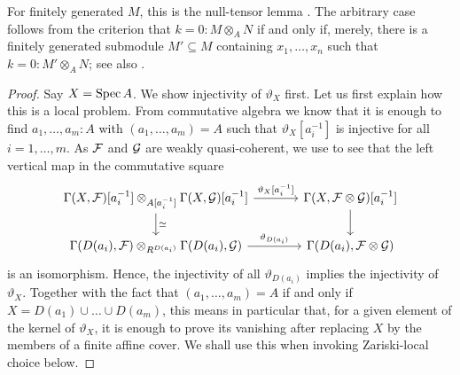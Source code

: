 For finitely generated $M$, this is the null-tensor lemma \cite[Lemma IV-4.14]{lombardi-quitte}.
The arbitrary case follows from the criterion that $k=0 : M\otimes_A N$ if and only if, merely, there is a finitely generated submodule $M'\subseteq M$ containing $x_1,\ldots,x_n$ such that $k = 0 : M' \otimes_A N$; see also \cite[Exercise IV-4]{lombardi-quitte}.
\begin{proof}
  Say $X = \operatorname{Spec} A$.
  We show injectivity of $\vartheta_X$ first.
  Let us first explain how this is a local problem.
  From commutative algebra we know that it is enough to find $a_1,\hdots,a_m:A$ with $(a_1,\hdots,a_m) = A$ such that $\vartheta_X[a_i^{-1}]$ is injective for all $i=1,\hdots,m$.
  As $\mathcal{F}$ and $\mathcal{G}$ are weakly quasi-coherent, we use \cite[Lemma 7.1.8]{draft} to see that the left vertical map in the commutative square
  \[ \begin{tikzcd}[column sep=large]
    \Gamma(X,\mc F)[a_i^{-1}] \otimes_{A[a_i^{-1}]} \Gamma(X,\mc G)[a_i^{-1}] \ar[d, "\simeq"]\ar[r, "\vartheta_X{[a_i^{-1}]}"]
    &
    \Gamma(X, \mc F \otimes \mc G)[a_i^{-1}] \ar[d]
    \\
    \Gamma(D(a_i),\mc F) \otimes_{R^{D(a_i)}}\Gamma(D(a_i),\mc G) \ar[r, "\vartheta_{D(a_i)}"]
    &
    \Gamma(D(a_i),\mc F \otimes \mc G)
  \end{tikzcd}
  \]
  is an isomorphism.
  Hence, the injectivity of all $\vartheta_{D(a_i)}$ implies the injectivity of $\vartheta_X$.
  Together with the fact that $(a_1,\hdots,a_m) = A$ if and only if $X = D(a_1) \cup \hdots \cup D(a_m)$, this means in particular that, for a given element of the kernel of $\vartheta_X$, it is enough to prove its vanishing after replacing $X$ by the members of a finite affine cover. We shall use this when invoking Zariski-local choice below.


\end{proof}
